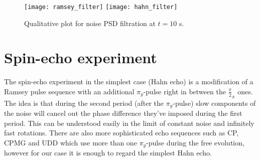 \documentclass[12pt, twoside]{report}
\numberwithin{equation}{section}
\begin{document}
\begin{figure}
\centering
\texttt{[image: ramsey\_filter]}\quad
\texttt{[image: hahn\_filter]}
\caption{Qualitative plot for noise PSD filtration at $t=10$ s.}
\end{figure}

\section{Spin-echo experiment}

The spin-echo experiment in the simplest case (Hahn echo) is a modification of a Ramsey pulse sequence with an additional $\pi_y$-pulse right in between the $\frac{\pi}{2}_x$ ones. The idea is that during the second period (after the $\pi_y$-pulse)  slow components of the noise will cancel out the phase difference they've imposed during the first period. This can be understood easily in the limit of constant noise and infinitely fast rotations. There are also more sophisticated echo sequences such as CP, CPMG and UDD\cite{Bylander2011} which use more than one $\pi_y$-pulse during the free evolution, however for our case it is enough to regard the simplest Hahn echo.
\end{document}
